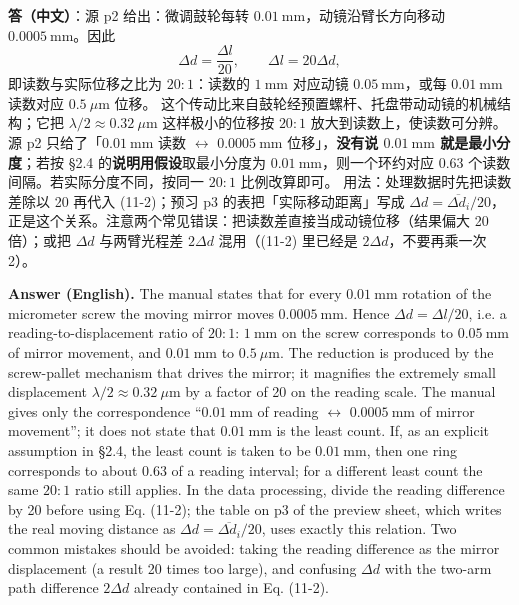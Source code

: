 \documentclass[11pt]{ctexart}
\newcommand{\Dl}{d}
\newcommand{\qaneed}[1]{\needspace{#1\textheight}}
\begin{document}
\textbf{答（中文）}：源 p2 给出：微调鼓轮每转 $0.01\ \mathrm{mm}$，动镜沿臂长方向移动 $0.0005\ \mathrm{mm}$。因此
\[
  \Delta\Dl=\frac{\Delta l}{20},\qquad \Delta l=20\Delta\Dl ,
\]
即读数与实际位移之比为 $20:1$：读数的 $1\ \mathrm{mm}$ 对应动镜 $0.05\ \mathrm{mm}$，或每 $0.01\ \mathrm{mm}$ 读数对应 $0.5\ \mu\mathrm{m}$ 位移。
这个传动比来自鼓轮经预置螺杆、托盘带动动镜的机械结构；它把 $\lambda/2\approx0.32\ \mu\mathrm{m}$ 这样极小的位移按 $20:1$ 放大到读数上，使读数可分辨。源 p2 只给了「$0.01\ \mathrm{mm}$ 读数 $\leftrightarrow$ $0.0005\ \mathrm{mm}$ 位移」，\textbf{没有说 $0.01\ \mathrm{mm}$ 就是最小分度}；若按 §2.4 的\textbf{说明用假设}取最小分度为 $0.01\ \mathrm{mm}$，则一个环约对应 $0.63$ 个读数间隔。若实际分度不同，按同一 $20:1$ 比例改算即可。
用法：处理数据时先把读数差除以 20 再代入 (11-2)；预习 p3 的表把「实际移动距离」写成 $\Delta\Dl=\overline{\Delta\Dl_i}/20$，正是这个关系。注意两个常见错误：把读数差直接当成动镜位移（结果偏大 20 倍）；或把 $\Delta\Dl$ 与两臂光程差 $2\Delta\Dl$ 混用（(11-2) 里已经是 $2\Delta\Dl$，不要再乘一次 2）。

\textbf{Answer (English).} The manual states that for every $0.01\ \mathrm{mm}$ rotation of the micrometer screw the moving mirror moves $0.0005\ \mathrm{mm}$. Hence $\Delta\Dl=\Delta l/20$, i.e. a reading-to-displacement ratio of $20:1$: $1\ \mathrm{mm}$ on the screw corresponds to $0.05\ \mathrm{mm}$ of mirror movement, and $0.01\ \mathrm{mm}$ to $0.5\ \mu\mathrm{m}$. The reduction is produced by the screw-pallet mechanism that drives the mirror; it magnifies the extremely small displacement $\lambda/2\approx0.32\ \mu\mathrm{m}$ by a factor of 20 on the reading scale. The manual gives only the correspondence ``$0.01\ \mathrm{mm}$ of reading $\leftrightarrow$ $0.0005\ \mathrm{mm}$ of mirror movement''; it does not state that $0.01\ \mathrm{mm}$ is the least count. If, as an explicit assumption in §2.4, the least count is taken to be $0.01\ \mathrm{mm}$, then one ring corresponds to about $0.63$ of a reading interval; for a different least count the same $20:1$ ratio still applies. In the data processing, divide the reading difference by 20 before using Eq. (11-2); the table on p3 of the preview sheet, which writes the real moving distance as $\Delta\Dl=\overline{\Delta\Dl_i}/20$, uses exactly this relation. Two common mistakes should be avoided: taking the reading difference as the mirror displacement (a result 20 times too large), and confusing $\Delta\Dl$ with the two-arm path difference $2\Delta\Dl$ already contained in Eq. (11-2).

\qaneed{0.58}
\end{document}
